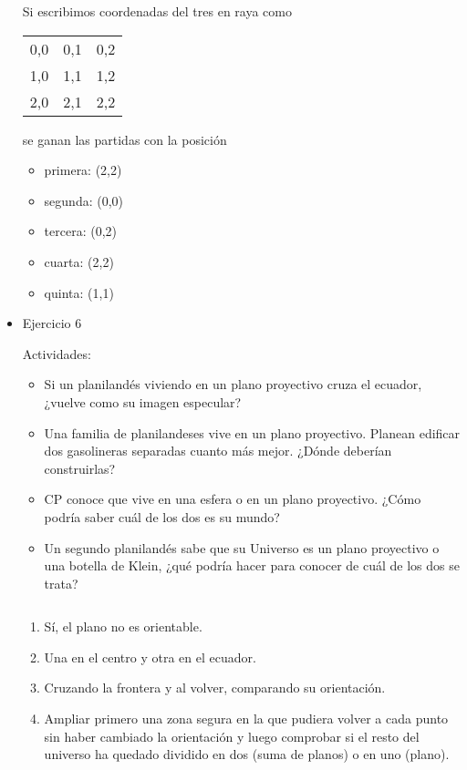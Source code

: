 \documentclass[11pt]{article}
\begin{document}
\begin{itemize}
Si escribimos coordenadas del tres en raya como

\begin{center}
\begin{tabular}{lll}
0,0 & 0,1 & 0,2\\
1,0 & 1,1 & 1,2\\
2,0 & 2,1 & 2,2\\
\end{tabular}
\end{center}

se ganan las partidas con la posición

\begin{itemize}
\item primera: (2,2)
\item segunda: (0,0)
\item tercera: (0,2)
\item cuarta: (2,2)
\item quinta: (1,1)
\end{itemize}

\item Ejercicio 6
\label{sec-5-3-1-6}
\begin{statement}
Actividades:

\begin{itemize}
\item Si un planilandés viviendo en un plano proyectivo cruza el ecuador,
¿vuelve como su imagen especular?
\item Una familia de planilandeses vive en un plano proyectivo. Planean
edificar dos gasolineras separadas cuanto más mejor. ¿Dónde deberían
construirlas?
\item CP conoce que vive en una esfera o en un plano proyectivo. ¿Cómo
podría saber cuál de los dos es su mundo?
\item Un segundo planilandés sabe que su Universo es un plano proyectivo o
una botella de Klein, ¿qué podría hacer para conocer de cuál de los dos
se trata?
\end{itemize}

$\quad$
\end{statement}

\begin{enumerate}
\item Sí, el plano no es orientable.
\item Una en el centro y otra en el ecuador.
\item Cruzando la frontera y al volver, comparando su orientación.
\item Ampliar primero una zona segura en la que pudiera volver a cada punto
sin haber cambiado la orientación y luego comprobar si el resto del
universo ha quedado dividido en dos (suma de planos) o en uno (plano).
\end{enumerate}


\end{itemize}
\end{document}
